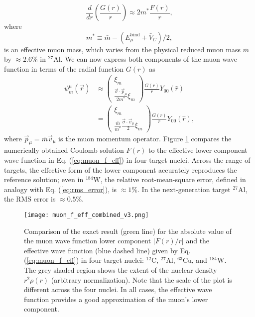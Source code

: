 \documentclass[12pt,letterpaper]{book}
\begin{document}
\begin{equation}
\frac{d}{dr}\left(\frac{G(r)}{r}\right)\approx 2m^*\frac{F(r)}{r},
\end{equation}
where
\begin{equation}
m^*\equiv \bar{m}-\left(E^\mathrm{bind}_{\mu}+\bar{V}_C\right)/2,
\end{equation}
is an effective muon mass, which varies from the physical reduced muon mass $\bar{m}$ by $\approx 2.6$\% in $^{27}$Al. 
We can now express both components of the muon wave function in terms of the radial function $G(r)$ as
\begin{equation}
\begin{split}
\psi^{\mu}_m(\vec{r})&\approx\left(\begin{array}{c}
\xi_m\\
\frac{\vec{\sigma}\cdot\vec{p}_{\mu}}{2m^*}\xi_m
\end{array}\right)\frac{G(r)}{r}Y_{00}(\hat{r})\\
&=\left(\begin{array}{c}
\xi_m\\
\frac{\bar{m}}{m^*}\frac{\vec{\sigma}\cdot\vec{v}_{\mu}}{2}\xi_m
\end{array}\right)\frac{G(r)}{r}Y_{00}(\hat{r}),
\end{split}
\label{eq:muon_f_eff}
\end{equation}
where $\vec{p}_{\mu}=\bar{m}\vec{v}_{\mu}$ is the muon momentum operator. Figure \ref{fig:muon_f_eff} compares the numerically obtained Coulomb solution $F(r)$ to the effective lower component wave function in Eq. (\ref{eq:muon_f_eff}) in four target nuclei. Across the range of targets, the effective form of the lower component accurately reproduces the reference solution; even in $^{184}$W, the relative root-mean-square error, defined in analogy with Eq. (\ref{eq:rms_error}), is $\approx 1\%$. In the next-generation target $^{27}$Al, the RMS error is $\approx 0.5\%$. 

\begin{figure}
\centering
\texttt{[image: muon\_f\_eff\_combined\_v3.png]}
\caption{Comparison of the exact result (green line) for the absolute value of the muon wave function lower component $|F(r)/r|$ and the effective wave function (blue dashed line) given by Eq. (\ref{eq:muon_f_eff}) in four target nuclei: $^{12}$C, $^{27}$Al, $^{63}$Cu, and $^{184}$W. The grey shaded region shows the extent of the nuclear density $r^2\rho(r)$ (arbitrary normalization). Note that the scale of the plot is different across the four nuclei. In all cases, the effective wave function provides a good approximation of the muon's lower component.} 
\label{fig:muon_f_eff}
\end{figure}
\end{document}
